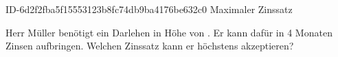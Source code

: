 \begin{exercise}
      {ID-6d2f2fba5f15553123b8fc74db9ba4176be632c0}
      {Maximaler Zinssatz}
  \ifproblem\problem\par
    Herr Müller benötigt ein Darlehen in Höhe von . Er kann dafür
    in \num{4} Monaten  Zinsen aufbringen. Welchen Zinssatz kann
    er höchstens akzeptieren?
  \fi
\end{exercise}
